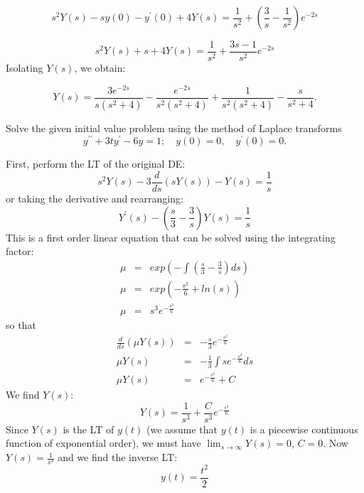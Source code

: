 \documentclass[11pt]{article}
\begin{document}
\begin{solution}
\begin{equation*}
s^2 Y(s) - s y(0)-y^{\prime}(0) +4 Y(s) = \frac{1}{s^{2}}+ \left( \frac{3}{s}-\frac{1}{s^{2}} \right)e^{-2s}
\end{equation*}


\begin{equation*}
s^2 Y(s) + s +4 Y(s) =\frac{1}{s^{2}}+ \frac{3s-1}{s^{2}} e^{-2s}
\end{equation*}
Isolating $Y(s)$, we obtain:

\begin{equation*}
\boxed{Y(s) = \dfrac{3e^{-2s}}{s(s^2+4)} -\dfrac{e^{-2s}}{s^2(s^2+4)} + \dfrac{1}{s^2(s^2+4)} -\dfrac{s}{s^2+4}}.
\end{equation*}
\end{solution}


\begin{problem}
Solve the given initial value problem using the method of Laplace transforms
\begin{equation*}
y^{\prime \prime} + 3 t y^{\prime} - 6y = 1 ; \quad y(0)=0, \quad y^{\prime}(0) = 0.
\end{equation*}
\end{problem}

\begin{solution}

  First, perform the LT of the original DE:
  \[ s^2 Y(s) - 3 \frac {d} {ds} \left( s Y(s) \right) - Y(s) = \frac {1} {s} \]
  or taking the derivative and rearranging:
  \[ Y^{\prime}(s) - \left( \frac {s} {3} - \frac {3} {s} \right) Y(s) = \frac {1} {s} \]
  This is a first order linear equation that can be solved using the integrating
  factor:
  \begin{eqnarray*}
    \mu & = & exp\left( - \int \left( \frac {s} {3} - \frac {3} {s} \right) ds \right) \\
    \mu & = & exp\left( - \frac {s^2} {6} + ln(s) \right) \\
    \mu & = & s^3 e^{-\frac {s^2} {6}}
  \end{eqnarray*}
  so that
  \begin{eqnarray*}
    \frac {d} {ds} \left( \mu Y(s) \right) & = & - \frac {s} {3} e^{-\frac {s^2} {6}} \\
    \mu Y(s) & = & - \frac {1} {3} \int s e^{-\frac {s^2} {6}} ds \\
    \mu Y(s) & = & e^{-\frac {s^2} {6}} + C
  \end{eqnarray*}
  We find $Y(s)$:
  \[ Y(s) = \frac {1} {s^3} + \frac {C} {s^3} e^{-\frac {s^2} {6}} \]
  Since $Y(s)$ is the LT of $y(t)$ (we assume that $y(t)$ is a 
  piecewise continuous function of exponential order), we must have
  $ \lim_{s \to \infty} Y(s) =0$, $C=0$. Now $Y(s) = \frac {1} {s^3}$ and we find
  the inverse LT:
  \begin{equation*}
    \boxed{y(t) = \frac {t^2} {2}}
  \end{equation*}
\end{solution}
\end{document}
